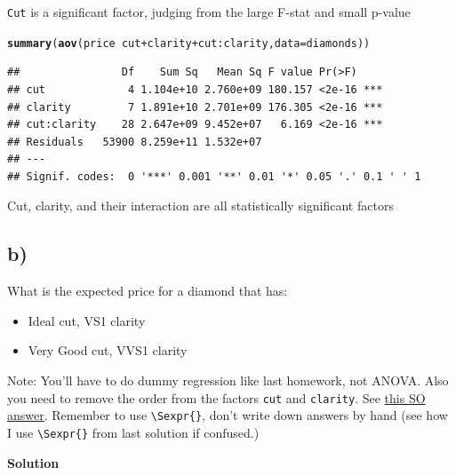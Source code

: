 \documentclass{article}\usepackage[]{graphicx}\usepackage[]{color}
\makeatletter
\newcommand{\hlopt}[1]{\textcolor[rgb]{0,0,0}{#1}}%
\newcommand{\hlstd}[1]{\textcolor[rgb]{0.345,0.345,0.345}{#1}}%
\newcommand{\hlkwc}[1]{\textcolor[rgb]{0.333,0.667,0.333}{#1}}%
\newcommand{\hlkwd}[1]{\textcolor[rgb]{0.737,0.353,0.396}{\textbf{#1}}}%
\newenvironment{kframe}{%
 \def\at@end@of@kframe{}%
 \ifinner\ifhmode%
  \def\at@end@of@kframe{\end{minipage}}%
  \begin{minipage}{\columnwidth}%
 \fi\fi%
 \def\FrameCommand##1{\hskip\@totalleftmargin \hskip-\fboxsep
 \colorbox{shadecolor}{##1}\hskip-\fboxsep
     \hskip-\linewidth \hskip-\@totalleftmargin \hskip\columnwidth}%
 \MakeFramed {\advance\hsize-\width
   \@totalleftmargin\z@ \linewidth\hsize
   \@setminipage}}%
 {\par\unskip\endMakeFramed%
 \at@end@of@kframe}
\newenvironment{knitrout}{}{} %
\makeatother
\begin{document}
\verb`Cut` is a significant factor, judging from the large F-stat and small p-value

\begin{knitrout}
\color{fgcolor}\begin{kframe}
\begin{alltt}
\hlkwd{summary}\hlstd{(}\hlkwd{aov}\hlstd{(price} \hlopt{~} \hlstd{cut} \hlopt{+} \hlstd{clarity} \hlopt{+} \hlstd{cut}\hlopt{:}\hlstd{clarity,} \hlkwc{data} \hlstd{= diamonds))}
\end{alltt}
\begin{verbatim}
##                Df    Sum Sq   Mean Sq F value Pr(>F)    
## cut             4 1.104e+10 2.760e+09 180.157 <2e-16 ***
## clarity         7 1.891e+10 2.701e+09 176.305 <2e-16 ***
## cut:clarity    28 2.647e+09 9.452e+07   6.169 <2e-16 ***
## Residuals   53900 8.259e+11 1.532e+07                   
## ---
## Signif. codes:  0 '***' 0.001 '**' 0.01 '*' 0.05 '.' 0.1 ' ' 1
\end{verbatim}
\end{kframe}
\end{knitrout}

Cut, clarity, and their interaction are all statistically significant factors

\subsection*{b)}

What is the expected price for a diamond that has:
\begin{itemize}
\item Ideal cut, VS1 clarity
\item Very Good cut, VVS1 clarity
\end{itemize}

Note: You'll have to do dummy regression like last homework, not ANOVA. Also you need to remove the order from the factors \verb`cut` and \verb`clarity`. See \href{http://stackoverflow.com/questions/17592524/how-to-remove-ordering-of-the-levels-from-factor-variable-in-r}{this SO answer}. Remember to use \verb`\Sexpr{}`, don't write down answers by hand (see how I use \verb`\Sexpr{}` from last solution if confused.)

\textbf{Solution}
\end{document}
